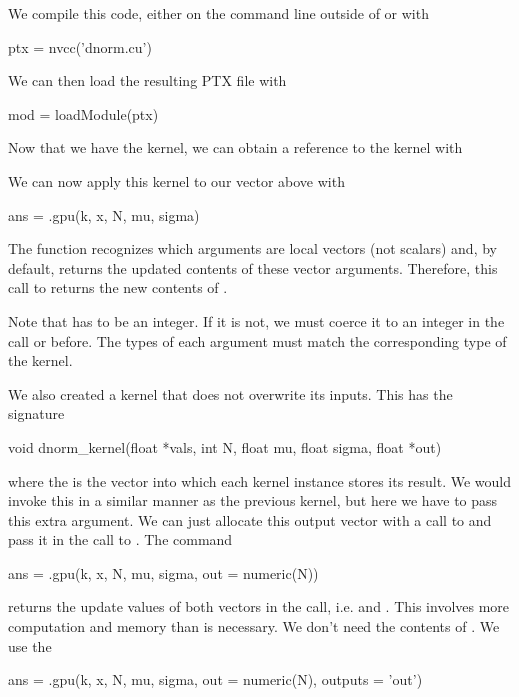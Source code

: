 We compile this code,  either on the command line outside 
of \R{} or with 
\begin{RCode}
ptx = nvcc('dnorm.cu')
\end{RCode}
We can then load the resulting PTX file with
\begin{RCode}
mod = loadModule(ptx)
\end{RCode}

Now that we have the kernel, we can obtain
a reference to the kernel with
We can now apply this kernel to our vector above with
\begin{RCode}
ans = .gpu(k, x, N, mu, sigma)
\end{RCode}
The  function recognizes which arguments
are local vectors (not scalars) and, by default, returns
the updated contents of these vector arguments.
Therefore, this call to  returns the new
contents of .

Note that  has to be an integer. If it is not, we must coerce
it to an integer in the call or before.  The types of each argument
must match the corresponding type of the kernel. 


We also created a kernel that does not overwrite its inputs.
This has the signature
\begin{CCode}
void dnorm_kernel(float *vals, int N, float mu, float sigma, float *out)
\end{CCode}
where the  is the vector into which each kernel instance
stores its result.
We would invoke this in a similar manner as the previous kernel,
but here we have to pass this extra argument.
We can just allocate this output vector with a call to  
and pass it in the call to .
The command
\begin{RCode}
ans = .gpu(k, x, N, mu, sigma, out = numeric(N))
\end{RCode}
returns the update values of both vectors in the call,
i.e.  and .
This involves more computation and memory
than is necessary.  We don't need the contents of
.
We use the 
\begin{RCode}
ans = .gpu(k, x, N, mu, sigma, out = numeric(N),
            outputs = 'out')
\end{RCode}

